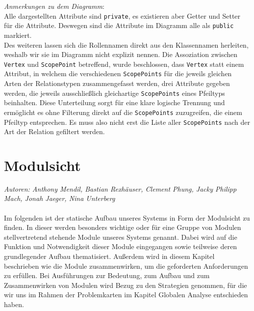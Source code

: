 \documentclass[enabledeprecatedfontcommands,fontsize=11pt,paper=a4,twoside]{scrartcl}
\begin{document}
	\textit{Anmerkungen zu dem Diagramm}: \\
	Alle dargestellten Attribute sind \texttt{private}, es existieren aber Getter und Setter für die Attribute. Deswegen sind die Attribute im Diagramm alle als \texttt{public} markiert. \\
	Des weiteren lassen sich die Rollennamen direkt aus den Klassennamen herleiten, weshalb wir sie im Diagramm nicht explizit nennen. Die Assoziation zwischen \texttt{Vertex} und \texttt{ScopePoint} betreffend, wurde beschlossen, dass \texttt{Vertex} statt einem Attribut, in welchem die verschiedenen \texttt{ScopePoints} für die jeweils gleichen Arten der Relationstypen zusammengefasst werden, drei Attribute gegeben werden, die jeweils ausschließlich gleichartige \texttt{ScopePoints} eines Pfeiltyps beinhalten. Diese Unterteilung sorgt für eine klare logische Trennung und ermöglicht es ohne Filterung direkt auf die \texttt{ScopePoints} zuzugreifen, die einem Pfeiltyp entsprechen. Es muss also nicht erst die Liste aller \texttt{ScopePoints} nach der Art der Relation gefiltert werden.\\
	
	
	
	
	\newpage
	\section{Modulsicht}
	\emph{Autoren: Anthony Mendil, Bastian Rexhäuser, Clement Phung, Jacky Philipp Mach, Jonah Jaeger, Nina Unterberg}\\\\
	
	Im folgenden ist der statische Aufbau unseres Systems in Form der Modulsicht zu finden. In dieser werden besonders wichtige oder für eine Gruppe von Modulen stellvertretend stehende Module unseres Systems genannt. Dabei wird auf die Funktion und Notwendigkeit dieser Module eingegangen sowie teilweise deren grundlegender Aufbau thematisiert. Außerdem wird in diesem Kapitel beschrieben wie die Module zusammenwirken, um die geforderten Anforderungen zu erfüllen. Bei Ausführungen zur Bedeutung, zum Aufbau und zum Zusammenwirken von Modulen wird Bezug zu den Strategien genommen, für die wir uns im Rahmen der Problemkarten im Kapitel \glqq Globalen Analyse\grqq{} entschieden haben. \\ \\
	
\end{document}
